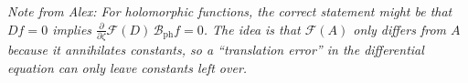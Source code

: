 \documentclass{article}
\theoremstyle{definition}
\theoremstyle{plain}
\newcommand{\phborel}{\mathcal{B}_\text{ph}}
\begin{document}
{\it Note from Alex: For holomorphic functions, the correct statement might be that $Df = 0$ implies $\tfrac{\partial}{\partial \zeta} \mathcal{F}(D)\,\phborel f = 0$. The idea is that $\mathcal{F}(A)$ only differs from $A$ because it annihilates constants, so a ``translation error'' in the differential equation can only leave constants left over.}
\end{document}
